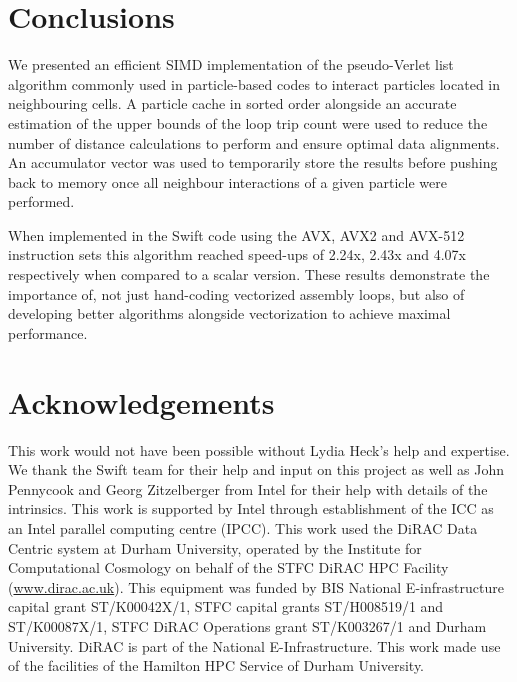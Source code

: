 \documentclass{IOS-Book-Article}
\newcommand{\swift}{{\sc Swift}\xspace}
\begin{document}
\section{Conclusions}

We presented an efficient SIMD implementation of the pseudo-Verlet list algorithm commonly used in particle-based codes to interact particles located in neighbouring cells. A particle cache in sorted order alongside an accurate estimation of the upper bounds of the loop trip count were used to reduce the number of distance calculations to perform and ensure optimal data alignments. An accumulator vector was used to temporarily store the results before pushing back to memory once all neighbour interactions of a given particle were performed. 

When implemented in the \swift code using the AVX, AVX2 and AVX-512 instruction sets this algorithm reached speed-ups of 2.24x, 2.43x and 4.07x respectively when compared to a scalar version. These results demonstrate the importance of, not just hand-coding vectorized assembly loops, but also of developing better algorithms alongside vectorization to achieve maximal performance.

\section{Acknowledgements}
This work would not have been possible without Lydia Heck's help and expertise. We thank the \swift team for their help and input on this project as well as John Pennycook and Georg Zitzelberger from {\sc Intel} for their help with details of the intrinsics. This work is supported by {\sc Intel} through establishment of the ICC as an {\sc Intel} parallel computing centre (IPCC). This work used the DiRAC Data Centric system at Durham University, operated by the Institute for Computational Cosmology on behalf of the STFC DiRAC HPC Facility (\url{www.dirac.ac.uk}). This equipment was funded by BIS National E-infrastructure capital grant ST/K00042X/1, STFC capital grants ST/H008519/1 and ST/K00087X/1, STFC DiRAC Operations grant ST/K003267/1 and Durham University. DiRAC is part of the National E-Infrastructure. This work made use of the facilities of the Hamilton HPC Service of Durham University.



\end{document}
